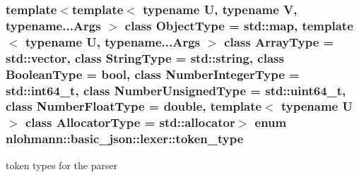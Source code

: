 \subsubsection[{token\+\_\+type}]{\setlength{\rightskip}{0pt plus 5cm}template$<$template$<$ typename U, typename V, typename...\+Args $>$ class Object\+Type = std\+::map, template$<$ typename U, typename...\+Args $>$ class Array\+Type = std\+::vector, class String\+Type  = std\+::string, class Boolean\+Type  = bool, class Number\+Integer\+Type  = std\+::int64\+\_\+t, class Number\+Unsigned\+Type  = std\+::uint64\+\_\+t, class Number\+Float\+Type  = double, template$<$ typename U $>$ class Allocator\+Type = std\+::allocator$>$ enum {\bf nlohmann\+::basic\+\_\+json\+::lexer\+::token\+\_\+type}\hspace{0.3cm}{\ttfamily [strong]}}\label{classnlohmann_1_1basic__json_1_1lexer_a96887d6cd131e3d3a85a9d71fbdbcdf7}


token types for the parser 

